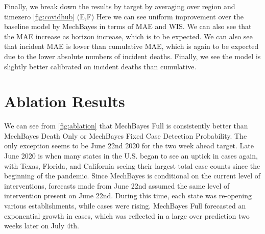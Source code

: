 \documentclass[11pt]{amsart}
\begin{document}
Finally, we break down the results by target by averaging over region and timezero  \ref{fig:covidhub} (E,F) Here we can see uniform improvement over the baseline model by MechBayes in terms of MAE and WIS. We can also see that the MAE increase as horizon increase, which is to be expected. We can also see that incident MAE is lower than cumulative MAE, which is again to be expected due to the lower absolute numbers of incident deaths. Finally, we see the model is slightly better calibrated on incident deaths than cumulative.
%
%   
   
   
   \section{Ablation Results}

We can see from \ref{fig:ablation} that MechBayes Full is consistently better than MechBayes Death Only or MechBayes Fixed Case Detection Probability. The only exception seems to be June 22nd 2020 for the two week ahead target. Late June 2020 is when many states in the U.S. began to see an uptick in cases again, with Texas, Florida, and California seeing their largest total case counts since the beginning of the pandemic. Since MechBayes is conditional on the current level of interventions, forecasts made from June 22nd assumed the same level of intervention present on June 22nd. During this time, each state was re-opening various establishments, while cases were rising. MechBayes Full forecasted an exponential growth in cases, which was reflected in a large over prediction two weeks later on July 4th. 
\end{document}
